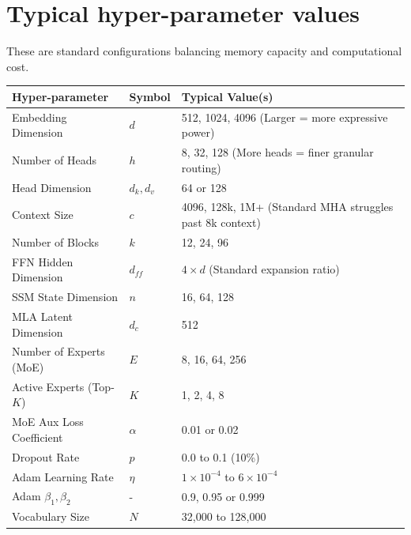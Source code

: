 \documentclass[11pt]{article}
\begin{document}
	\section{Typical hyper-parameter values}
	These are standard configurations balancing memory capacity and computational cost.
	\begin{center}
		\begin{tabular}{@{}lll@{}}
			\toprule
			\textbf{Hyper-parameter} & \textbf{Symbol} & \textbf{Typical Value(s)} \\ \midrule
			Embedding Dimension      & $d$             & 512, 1024, 4096 (Larger = more expressive power)          \\
			Number of Heads          & $h$             & 8, 32, 128 (More heads = finer granular routing)              \\
			Head Dimension           & $d_k, d_v$      & 64 or 128                 \\
			Context Size             & $c$             & 4096, 128k, 1M+ (Standard MHA struggles past 8k context)           \\
			Number of Blocks         & $k$             & 12, 24, 96                \\
			FFN Hidden Dimension     & $d_{ff}$        & $4 \times d$ (Standard expansion ratio)              \\
			SSM State Dimension      & $n$             & 16, 64, 128               \\
			MLA Latent Dimension     & $d_c$           & 512                       \\
			Number of Experts (MoE)  & $E$             & 8, 16, 64, 256            \\
			Active Experts (Top-$K$) & $K$             & 1, 2, 4, 8                \\
			MoE Aux Loss Coefficient & $\alpha$        & 0.01 or 0.02              \\
			Dropout Rate             & $p$             & 0.0 to 0.1 (10\%)         \\
			Adam Learning Rate       & $\eta$          & $1 \times 10^{-4}$ to $6 \times 10^{-4}$ \\
			Adam $\beta_1, \beta_2$  & -               & 0.9, 0.95 or 0.999        \\
			Vocabulary Size          & $N$             & 32,000 to 128,000         \\ \bottomrule
		\end{tabular}
	\end{center}
	
\end{document}
